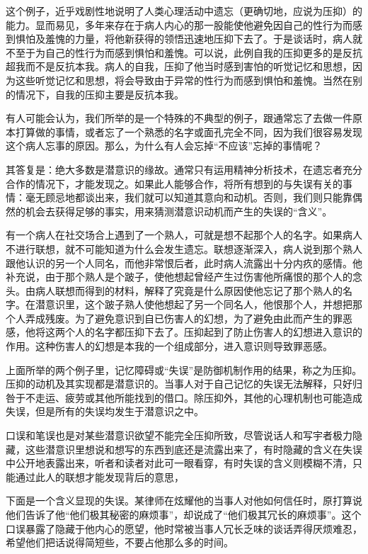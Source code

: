 \documentclass[UTF8,10pt,a4paper,openany]{book}
\begin{document}
这个例子，近乎戏剧性地说明了人类心理活动中遗忘（更确切地，应说为压抑）的能力。显而易见，多年来存在于病人内心的那一股能使他避免因自己的性行为而感到惧怕及羞愧的力量，将他新获得的领悟迅速地压抑下去了。于是谈话时，病人就不至于为自己的性行为而感到惧怕和羞愧。可以说，此例自我的压抑更多的是反抗超我而不是反抗本我。病人的自我，压抑了他当时感到害怕的听觉记忆和思想，因为这些听觉记忆和思想，将会导致由于异常的性行为而感到惧怕和羞愧。当然在别的情况下，自我的压抑主要是反抗本我。

有人可能会认为，我们所举的是一个特殊的不典型的例子，跟通常忘了去做一件原本打算做的事情，或者忘了一个熟悉的名字或面孔完全不同，因为我们很容易发现这个病人忘事的原因。那么，为什么有人会忘掉“不应该”忘掉的事情呢？

其答复是：绝大多数是潜意识的缘故。通常只有运用精神分析技术，在遗忘者充分合作的情况下，才能发现之。如果此人能够合作，将所有想到的与失误有关的事情：毫无顾忌地都谈出来，我们就可以知道其意向和动机。否则，我们则只能靠偶然的机会去获得足够的事实，用来猜测潜意识动机而产生的失误的“含义”。

有一个病人在社交场合上遇到了一个熟人，可就是想不起那个人的名字。如果病人不进行联想，就不可能知道为什么会发生遗忘。联想逐渐深入，病人说到那个熟人跟他认识的另一个人同名，而他非常恨后者，此时病人流露出十分内疚的感情。他补充说，由于那个熟人是个跛子，使他想起曾经产生过伤害他所痛恨的那个人的念头。由病人联想而得到的材料，解释了究竟是什么原因使他忘记了那个熟人的名字。在潜意识里，这个跛子熟人使他想起了另一个同名人，他恨那个人，并想把那个人弄成残废。为了避免意识到自已伤害人的幻想，为了避免由此而产生的罪恶感，他将这两个人的名字都压抑下去了。压抑起到了防止伤害人的幻想进入意识的作用。这种伤害人的幻想是本我的一个组成部分，进入意识则导致罪恶感。

上面所举的两个例子里，记忆障碍或“失误”是防御机制作用的结果，称之为压抑。压抑的动机及其实现都是潜意识的。当事人对于自己记忆的失误无法解释，只好归咎于不走运、疲劳或其他所能找到的借口。除压抑外，其他的心理机制也可能造成失误，但是所有的失误均发生于潜意识之中。

口误和笔误也是对某些潜意识欲望不能完全压抑所致，尽管说话人和写宇者极力隐藏，这些潜意识里想说和想写的东西到底还是流露出来了，有时隐藏的含义在失误中公开地表露出来，听者和读者对此可一眼看穿，有时失误的含义则模糊不清，只能通过此人的联想才能发现背后的意思，

下面是一个含义显现的失误。某律师在炫耀他的当事人对他如何信任时，原打算说他们告诉了他“他们极其秘密的麻烦事”，却说成了“他们极其冗长的麻烦事”。这个口误暴露了隐藏于他内心的愿望，他时常被当事人冗长乏味的谈话弄得厌烦难忍，希望他们把话说得简短些，不要占他那么多的时间。
\end{document}
